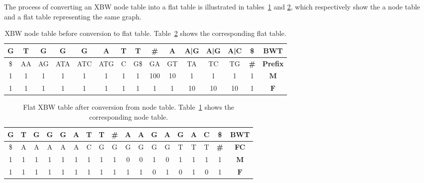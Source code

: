 \documentclass[a4paper,12pt,twoside,BCOR=10mm]{scrbook}
\begin{document}
The process of converting an XBW node table into a flat table is illustrated in tables~\ref{table:evo_node_to_flat_node} 
and \ref{table:evo_node_to_flat_flat}, which respectively show the a node table and a flat table representing the same graph. \\
{
\renewcommand{\tabcolsep}{5pt}
\begin{table}[htb]
\centering
\caption[XBW node table before conversion to flat table]{XBW node table before conversion to flat table. 
Table~\ref{table:evo_node_to_flat_flat} shows the corresponding flat table.}
\begin{tabular}{ | c | c | c | c | c | c | c | c | c | c | c | c | c | c | c | }
\hline
G & T & G & G & G & A & T & T & \textbf{\#} & A & A|G & A|G & A|C & \$ & \textbf{BWT} \\ \hline 
\$ & AA & AG & ATA & ATC & ATG & C & G\$ & GA & GT & TA & TC & TG & \textbf{\#} & \textbf{Prefix} \\ \hline 
1 & 1 & 1 & 1 & 1 & 1 & 1 & 1 & 100 & 10 & 1 & 1 & 1 & 1 & $\boldsymbol{M}$ \\ \hline 
1 & 1 & 1 & 1 & 1 & 1 & 1 & 1 & 1 & 1 & 10 & 10 & 10 & 1 & $\boldsymbol{F}$ \\ \hline 
\end{tabular}
\label{table:evo_node_to_flat_node}
\end{table}
}
\begin{table}[htb]
\centering
\caption[Flat XBW table after conversion from node table]{Flat XBW table after conversion from node table. 
Table~\ref{table:evo_node_to_flat_node} shows the corresponding node table.}
\begin{tabular}{ | c | c | c | c | c | c | c | c | c | c | c | c | c | c | c | c | c | c | }
\hline
G & T & G & G & G & A & T & T & \textbf{\#} & A & A & G & A & G & A & C & \$ & \textbf{BWT} \\ \hline 
\$ & A & A & A & A & A & C & G & G & G & G & G & G & T & T & T & \textbf{\#} & \textbf{FC} \\ \hline 
1 & 1 & 1 & 1 & 1 & 1 & 1 & 1 & 1 & 0 & 0 & 1 & 0 & 1 & 1 & 1 & 1 & $\boldsymbol{M}$ \\ \hline 
1 & 1 & 1 & 1 & 1 & 1 & 1 & 1 & 1 & 1 & 1 & 0 & 1 & 0 & 1 & 0 & 1 & $\boldsymbol{F}$ \\ \hline
\end{tabular}
\label{table:evo_node_to_flat_flat}
\end{table}
\end{document}
